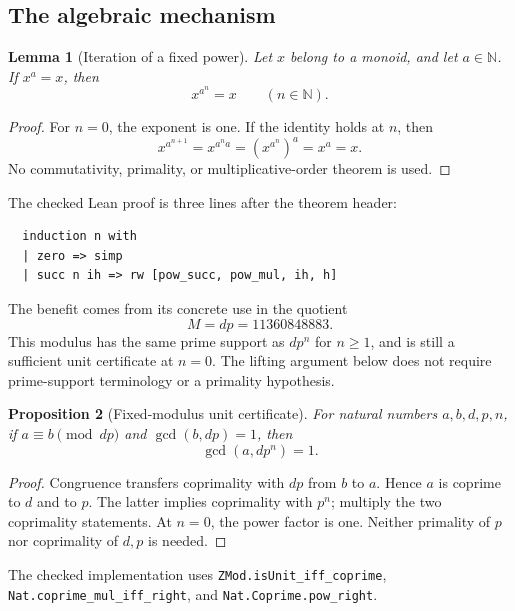 \documentclass[11pt]{article}
\newcommand{\N}{\mathbb N}
\newcommand{\code}[1]{\nolinkurl{#1}}
\newtheorem{proposition}{Proposition}[section]
\newtheorem{lemma}[proposition]{Lemma}
\begin{document}
\subsection{The algebraic mechanism}
\begin{lemma}[Iteration of a fixed power]
Let \(x\) belong to a monoid, and let \(a\in\N\). If \(x^a=x\), then
\[
 x^{a^n}=x\qquad(n\in\N).
\]
\end{lemma}
\begin{proof}
For \(n=0\), the exponent is one. If the identity holds at \(n\), then
\[
 x^{a^{n+1}}=x^{a^n a}=(x^{a^n})^a=x^a=x.
\]
No commutativity, primality, or multiplicative-order theorem is used.
\end{proof}
The checked Lean proof is three lines after the theorem header:
\begin{lstlisting}
  induction n with
  | zero => simp
  | succ n ih => rw [pow_succ, pow_mul, ih, h]
\end{lstlisting}
The benefit comes from its concrete use in the quotient
\[
 M=dp=\boxed{11360848883}.
\]
This modulus has the same prime support as \(dp^n\) for \(n\ge1\), and is
still a sufficient unit certificate at \(n=0\). The lifting argument below does
not require prime-support terminology or a primality hypothesis.

\begin{proposition}[Fixed-modulus unit certificate]
For natural numbers \(a,b,d,p,n\), if
\(a\equiv b\pmod{dp}\) and \(\gcd(b,dp)=1\), then
\[
 \gcd(a,dp^n)=1.
\]
\end{proposition}
\begin{proof}
Congruence transfers coprimality with \(dp\) from \(b\) to \(a\). Hence
\(a\) is coprime to \(d\) and to \(p\). The latter implies coprimality with
\(p^n\); multiply the two coprimality statements. At \(n=0\), the power factor
is one. Neither primality of \(p\) nor coprimality of \(d,p\) is needed.
\end{proof}
The checked implementation uses \code{ZMod.isUnit_iff_coprime},
\code{Nat.coprime_mul_iff_right}, and \code{Nat.Coprime.pow_right}.
\end{document}
